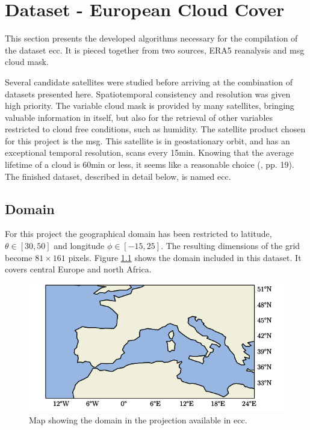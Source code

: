 \chapter{Dataset - European Cloud Cover }
This section presents the developed algorithms necessary for the compilation of the dataset \acrfull{ecc}. It is pieced together from two sources, ERA5 reanalysis and \acrlong{msg} cloud mask.

Several candidate satellites were studied before arriving at the combination of datasets presented here. Spatiotemporal consistency and resolution was given high priority. The variable cloud mask is provided by many satellites, bringing valuable information in itself, but also for the retrieval of other variables restricted to cloud free conditions, such as humidity. The satellite product chosen for this project is the \acrfull{msg}. This satellite is in geostationary orbit, and has an exceptional temporal resolution, scans every 15min. Knowing that the average lifetime of a cloud is 60min or less, it seems like a reasonable choice (\cite{lohmann2016}, pp. 19). The finished dataset, described in detail below, is named \acrfull{ecc}.

\section{Domain}
For this project the geographical domain has been restricted to latitude, $\theta \in[30,50]$ and longitude $\phi \in [-15, 25]$. The resulting dimensions of the grid become $81\times161$ pixels. Figure \ref{fig:map} shows the domain included in this dataset. It covers central Europe and north Africa.
\begin{figure}[h]
    \centering
    \includegraphics[scale = 1.0]{python_figs/Domain.png}
    \caption[Map over domain.]{Map showing the domain in the projection available in \acrshort{ecc}.}
    \label{fig:map}
\end{figure}

